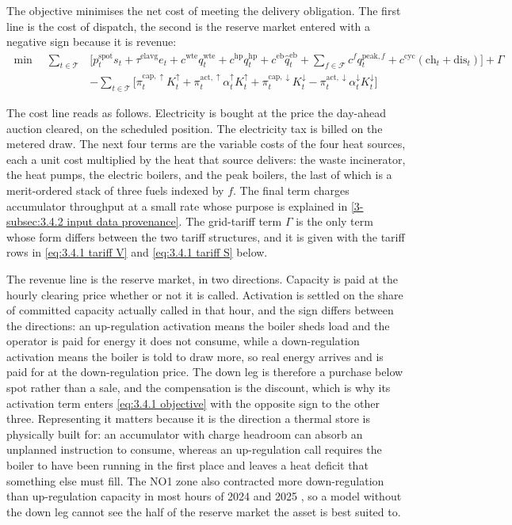 The objective minimises the net cost of meeting the delivery obligation. The first line is the cost of dispatch, the second is the reserve market entered with a negative sign because it is revenue:
\begin{equation}
\begin{aligned}
\min \quad \sum_{t \in \mathcal{T}} & \Big[ p^{\text{spot}}_t s_t + \tau^{\text{elavg}} e_t + c^{\text{wte}} q^{\text{wte}}_t + c^{\text{hp}} q^{\text{hp}}_t + c^{\text{eb}} \hat{q}^{\text{eb}}_t + \sum_{f \in \mathcal{F}} c^{f} q^{\text{peak},f}_t + c^{\text{cyc}} (\text{ch}_t + \text{dis}_t) \Big] + \Gamma \\[3pt]
& - \sum_{t \in \mathcal{T}} \Big[ \pi^{\text{cap},\uparrow}_t K^{\uparrow}_t + \pi^{\text{act},\uparrow}_t \alpha^{\uparrow}_t K^{\uparrow}_t + \pi^{\text{cap},\downarrow}_t K^{\downarrow}_t - \pi^{\text{act},\downarrow}_t \alpha^{\downarrow}_t K^{\downarrow}_t \Big]
\end{aligned}
\label{eq:3.4.1 objective}
\end{equation}

The cost line reads as follows. Electricity is bought at the price the day-ahead auction cleared, on the scheduled position. The electricity tax is billed on the metered draw. The next four terms are the variable costs of the four heat sources, each a unit cost multiplied by the heat that source delivers: the waste incinerator, the heat pumps, the electric boilers, and the peak boilers, the last of which is a merit-ordered stack of three fuels indexed by $f$. The final term charges accumulator throughput at a small rate whose purpose is explained in \autoref{3-subsec:3.4.2 input data provenance}. The grid-tariff term $\Gamma$ is the only term whose form differs between the two tariff structures, and it is given with the tariff rows in \autoref{eq:3.4.1 tariff V} and \autoref{eq:3.4.1 tariff S} below.

The revenue line is the reserve market, in two directions. Capacity is paid at the hourly clearing price whether or not it is called. Activation is settled on the share of committed capacity actually called in that hour, and the sign differs between the directions: an up-regulation activation means the boiler sheds load and the operator is paid for energy it does not consume, while a down-regulation activation means the boiler is told to draw more, so real energy arrives and is paid for at the down-regulation price. The down leg is therefore a purchase below spot rather than a sale, and the compensation is the discount, which is why its activation term enters \autoref{eq:3.4.1 objective} with the opposite sign to the other three. Representing it matters because it is the direction a thermal store is physically built for: an accumulator with charge headroom can absorb an unplanned instruction to consume, whereas an up-regulation call requires the boiler to have been running in the first place and leaves a heat deficit that something else must fill. The NO1 zone also contracted more down-regulation than up-regulation capacity in most hours of 2024 and 2025 \cite{entsoe_entsoe_nodate}, so a model without the down leg cannot see the half of the reserve market the asset is best suited to.

